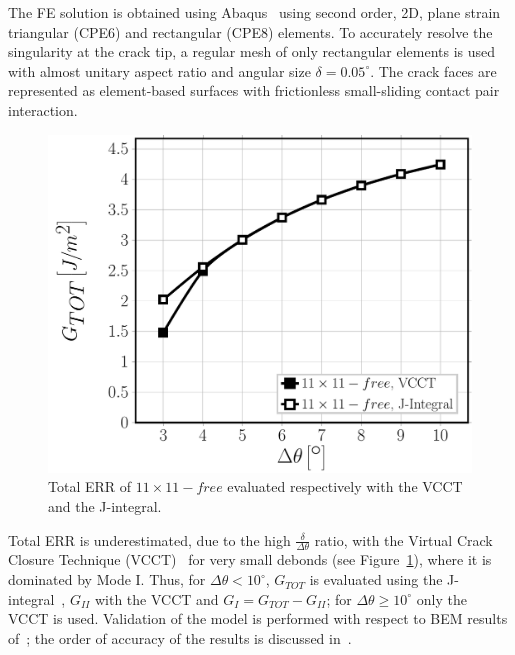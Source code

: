 The FE solution is obtained using Abaqus~\cite{abq12} using second order, 2D, plane strain triangular (CPE6) and rectangular (CPE8) elements. To accurately resolve the singularity at the crack tip, a regular mesh of only rectangular elements is used with almost unitary aspect ratio and angular size $\delta=0.05^{\circ}$. The crack faces are represented as element-based surfaces with frictionless small-sliding contact pair interaction.

\begin{figure}[!h]
\centering
        \includegraphics[height=0.2\textheight]{paperE/vf60-G-methodsaccuracy.pdf}
\caption{Total ERR of $11\times11-free$ evaluated respectively with the VCCT and the J-integral.}\label{paperE:fig:errerror}
\end{figure}

Total ERR is underestimated, due to the high $\frac{\delta}{\Delta\theta}$ ratio, with the Virtual Crack Closure Technique (VCCT)~\cite{Krueger2004} for very small debonds (see Figure~\ref{paperE:fig:errerror}), where it is dominated by Mode I. Thus, for $\Delta\theta<10^{\circ}$, $G_{TOT}$ is evaluated using the J-integral~\cite{Rice1968}, $G_{II}$ with the VCCT and $G_{I}=G_{TOT}-G_{II}$; for $\Delta\theta\geq10^{\circ}$ only the VCCT is used. Validation of the model is performed with respect to BEM results of~\cite{Paris2007,Sandino2016}; the order of accuracy of the results is discussed in~\cite{DiStasio2019}.

